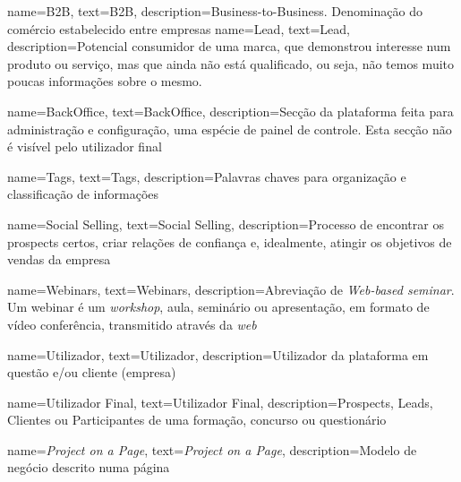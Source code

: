 {
        name=B2B,
        text=B2B,
        description={Business-to-Business. Denominação do comércio estabelecido entre empresas}
}
{
	name=Lead,
	text=Lead,
	description={Potencial consumidor de uma marca, que demonstrou interesse num produto ou serviço, mas que ainda não está qualificado, ou seja, não temos muito poucas informações sobre o mesmo.}
}


{
	name=BackOffice,
	text=BackOffice,
	description={Secção da plataforma feita para administração e configuração, uma espécie de painel de controle. Esta secção não é visível pelo utilizador final}
}

{
	name=Tags,
	text=Tags,
	description={Palavras chaves para organização e classificação de informações}
}

{
	name=Social Selling,
	text=Social Selling,
	description={Processo de encontrar os prospects certos, criar relações de confiança e, idealmente, atingir os objetivos de vendas da empresa}
}

{
	name=Webinars,
	text=Webinars,
	description={Abreviação de \textit{Web-based seminar}. Um webinar é um \textit{workshop}, aula, seminário ou apresentação, em formato de vídeo conferência, transmitido através da \textit{web}}
}

{
	name=Utilizador,
	text=Utilizador,
	description={Utilizador da plataforma em questão e/ou cliente (empresa)}
}

{
	name=Utilizador Final,
	text=Utilizador Final,
	description={Prospects, Leads, Clientes ou Participantes de uma formação, concurso ou questionário}
}

{
	name=\textit{Project on a Page},
	text=\textit{Project on a Page},
	description={Modelo de negócio descrito numa página}
}


